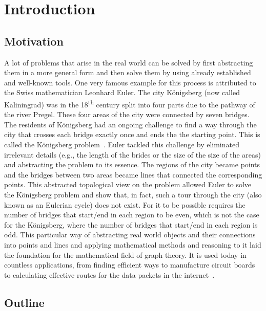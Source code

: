 \chapter{Introduction}
\label{cha:introduction}


\section{Motivation}
\label{sec:motivation}

A lot of problems that arise in the real world can be solved by first abstracting them in a more general form and then solve them by using already established and well-known tools.
One very famous example for this process is attributed to the Swiss mathematician Leonhard Euler.
The city Königsberg (now called Kaliningrad) was in the 18\textsuperscript{th} century split into four parts due to the pathway of the river Pregel.
These four areas of the city were connected by seven bridges.
The residents of Königsberg had an ongoing challenge to find a way through the city that crosses each bridge exactly once and ends the the starting point.
This is called the Königsberg problem~\cite{Paoletti2011, Cook2012}.
Euler tackled this challenge by eliminated irrelevant details (e.g., the length of the brides or the size of the size of the areas) and abstracting the problem to its essence.
The regions of the city became points and the bridges between two areas became lines that connected the corresponding points.
This abstracted topological view on the problem allowed Euler to solve the Königsberg problem and show that, in fact, such a tour through the city (also known as an Eulerian cycle) does not exist.
For it to be possible requires the number of bridges that start/end in each region to be even, which is not the case for the Königsberg, where the number of bridges that start/end in each region is odd.
This particular way of abstracting real world objects and their connections into points and lines and applying mathematical methods and reasoning to it laid the foundation for the mathematical field of graph theory.
It is used today in countless applications, from finding efficient ways to manufacture circuit boards~\cite{Cook2012} to calculating effective routes for the data packets in the internet~\cite{Wang1999}.




\section{Outline}
\label{sec:outline}

